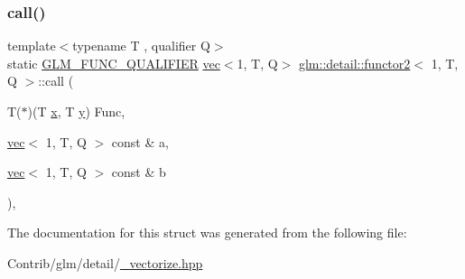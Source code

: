 \subsubsection{\texorpdfstring{call()}{call()}}
{\footnotesize\ttfamily template$<$typename T , qualifier Q$>$ \\
static \mbox{\hyperlink{setup_8hpp_a33fdea6f91c5f834105f7415e2a64407}{G\+L\+M\+\_\+\+F\+U\+N\+C\+\_\+\+Q\+U\+A\+L\+I\+F\+I\+ER}} \mbox{\hyperlink{structglm_1_1vec}{vec}}$<$1, T, Q$>$ \mbox{\hyperlink{structglm_1_1detail_1_1functor2}{glm\+::detail\+::functor2}}$<$ 1, T, Q $>$\+::call (\begin{DoxyParamCaption}\item[{T($\ast$)(T \mbox{\hyperlink{_s_d_l__opengl_8h_ad0e63d0edcdbd3d79554076bf309fd47}{x}}, T \mbox{\hyperlink{_s_d_l__opengl_8h_a1675d9d7bb68e1657ff028643b4037e3}{y}})}]{Func,  }\item[{\mbox{\hyperlink{structglm_1_1vec}{vec}}$<$ 1, T, Q $>$ const \&}]{a,  }\item[{\mbox{\hyperlink{structglm_1_1vec}{vec}}$<$ 1, T, Q $>$ const \&}]{b }\end{DoxyParamCaption})\hspace{0.3cm}{\ttfamily [inline]}, {\ttfamily [static]}}



The documentation for this struct was generated from the following file\+:\begin{DoxyCompactItemize}
\item 
Contrib/glm/detail/\mbox{\hyperlink{__vectorize_8hpp}{\+\_\+vectorize.\+hpp}}\end{DoxyCompactItemize}
